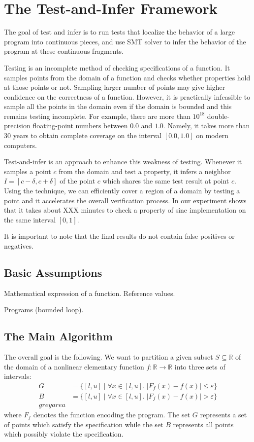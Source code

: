\section{The Test-and-Infer Framework}

The goal of test and infer is to run tests that localize the behavior of a large program into continuous pieces, and use SMT solver to infer the behavior of the program at these continuous fragments. 




Testing is an incomplete method of checking specifications of a
function. It samples points from the domain of a function and checks
whether properties hold at those points or not. Sampling larger number
of points may give higher confidence on the correctness of a function.
However, it is practically infeasible to sample all the points in the
domain even if the domain is bounded and this remains testing
incomplete. For example, there are more than $10^{18}$ double-precision
floating-point numbers between $0.0$ and $1.0$. Namely, it takes more than 30 years to obtain complete coverage on the interval $[0.0, 1.0]$ on modern computers.

Test-and-infer is an approach to enhance this weakness of testing.
Whenever it samples a point $c$ from the domain and test a property,
it infers a neighbor $I = [c - \delta, c + \delta]$ of the point $c$
which shares the same test result at point $c$. Using the technique,
we can efficiently cover a region of a domain by testing a point and
it accelerates the overall verification process. In our experiment
shows that it takes about XXX minutes to check a property of sine
implementation on the same interval $[0, 1]$.

It is important to note that the final results do not contain false positives or negatives. 

\subsection{Basic Assumptions}

Mathematical expression of a function. Reference values. 

Programs (bounded loop). 

\subsection{The Main Algorithm}
The overall goal is the following. We want to partition a given subset $S \subseteq \mathbb{R}$ of the
domain of a nonlinear elementary function $f : \mathbb{R} \to
\mathbb{R}$ into three sets of intervals:
\begin{align*}
  G & = \{ [l, u] \mid \forall x \in [l, u]. \; | F_f(x) - f(x) | \le \varepsilon \}\\
  B & = \{ [l, u] \mid \forall x \in [l, u]. \; | F_f(x) - f(x) | > \varepsilon \}\\
  grey area &
\end{align*}
where $F_f$ denotes the function encoding the program. The set $G$
represents a set of points which satisfy the specification while the
set $B$ represents all points which possibly violate the
specification. 


